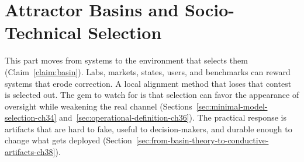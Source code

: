 \part{Attractor Basins and Socio-Technical Selection}

This part moves from systems to the environment that selects them (Claim~\ref{claim:basin}).
Labs, markets, states, users, and benchmarks can reward systems that erode correction.
A local alignment method that loses that contest is selected out.
The gem to watch for is that selection can favor the appearance of oversight while weakening the real channel (Sections~\ref{sec:minimal-model-selection-ch34} and~\ref{sec:operational-definition-ch36}).
The practical response is artifacts that are hard to fake, useful to decision-makers, and durable enough to change what gets deployed (Section~\ref{sec:from-basin-theory-to-conductive-artifacts-ch38}).






